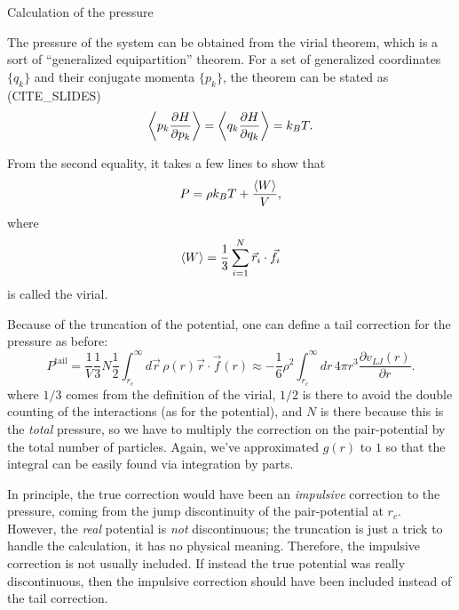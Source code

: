 \documentclass[10pt, compress, protectframetitle, handout]{beamer}
\begin{document}
\begin{frame}[allowframebreaks]{Calculation of the pressure}

	The pressure of the system can be obtained from the \alert{virial theorem}, which is a sort of ``generalized equipartition'' theorem. For a set of generalized coordinates $\{q_k\}$ and their conjugate momenta $\{p_k\}$, the theorem can be stated as (CITE\_SLIDES)
	\begin{equation}
		\Braket{p_k\frac{\partial H}{\partial p_k}} = \Braket{q_k\frac{\partial H}{\partial q_k}} = k_BT.
	\end{equation}
	
	From the second equality, it takes a few lines to show that
	\begin{equation}
		P = \rho k_B T + \frac{\Braket{W}}{V},
	\end{equation}
	where
	\begin{equation}
		\Braket{W} = \frac{1}{3} \sum_{i=1}^{N} \vec{r}_{i} \cdot \vec{f}_{i} 
	\end{equation}
	is called the \alert{virial}.
	
	Because of the truncation of the potential, one can define a tail correction for the pressure as before:
	\begin{equation}
		P^{\text{tail}} = \frac{1}{V}\frac{1}{3}N\frac{1}{2}\int_{r_c}^{\infty}d\vec{r}\,\rho(r) \vec{r} \cdot \vec{f}(r) \approx -\frac{1}{6}\rho^2\int_{r_c}^{\infty}dr\,4\pi r^3\frac{\partial v_{LJ}(r)}{\partial r}.
	\end{equation}
	where $1/3$ comes from the definition of the virial, $1/2$ is there to avoid the double counting of the interactions (as for the potential), and $N$ is there because this is the \emph{total} pressure, so we have to multiply the correction on the pair-potential by the total number of particles. Again, we've approximated $g(r)$ to $1$ so that the integral can be easily found via integration by parts.
	
	In principle, the true correction would have been an \emph{impulsive} correction to the pressure, coming from the jump discontinuity of the pair-potential at $r_c$. However, the \emph{real} potential is \emph{not} discontinuous; the truncation is just a trick to handle the calculation, it has no physical meaning. Therefore, the impulsive correction is not usually included. If instead the true potential was really discontinuous, then the impulsive correction should have been included instead of the tail correction.

\end{frame}
\end{document}
